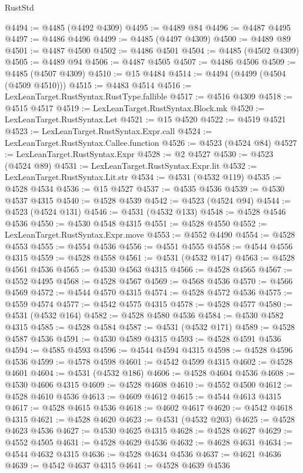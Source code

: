 \begin{lexlean}{RustStd}
\begin{coremodule}
@4494 := @4485 (@4492 @4309)
@4495 := @4489 @84
@4496 := @4487 @4495
@4497 := @4486 @4496
@4499 := @4485 (@4497 @4309)
@4500 := @4489 @89
@4501 := @4487 @4500
@4502 := @4486 @4501
@4504 := @4485 (@4502 @4309)
@4505 := @4489 @94
@4506 := @4487 @4505
@4507 := @4486 @4506
@4509 := @4485 (@4507 @4309)
@4510 := @15 @4484
@4514 := @4494 (@4499 (@4504 (@4509 @4510)))
@4515 := @4483 @4514
@4516 := LexLeanTarget.RustSyntax.RustType.fallible
@4517 := @4516 @4309
@4518 := @4515 @4517
@4519 := LexLeanTarget.RustSyntax.Block.mk
@4520 := LexLeanTarget.RustSyntax.Let
@4521 := @15 @4520
@4522 := @4519 @4521
@4523 := LexLeanTarget.RustSyntax.Expr.call
@4524 := LexLeanTarget.RustSyntax.Callee.function
@4526 := @4523 (@4524 @84)
@4527 := LexLeanTarget.RustSyntax.Expr
@4528 := @2 @4527
@4530 := @4523 (@4524 @89)
@4531 := LexLeanTarget.RustSyntax.Expr.lit
@4532 := LexLeanTarget.RustSyntax.Lit.str
@4534 := @4531 (@4532 @119)
@4535 := @4528 @4534
@4536 := @15 @4527
@4537 := @4535 @4536
@4539 := @4530 @4537 @4315
@4540 := @4528 @4539
@4542 := @4523 (@4524 @94)
@4544 := @4523 (@4524 @131)
@4546 := @4531 (@4532 @133)
@4548 := @4528 @4546 @4536
@4550 := @4530 @4548 @4315
@4551 := @4528 @4550
@4552 := LexLeanTarget.RustSyntax.Expr.move
@4553 := @4552 @4490
@4554 := @4528 @4553
@4555 := @4554 @4536
@4556 := @4551 @4555
@4558 := @4544 @4556 @4315
@4559 := @4528 @4558
@4561 := @4531 (@4532 @147)
@4563 := @4528 @4561 @4536
@4565 := @4530 @4563 @4315
@4566 := @4528 @4565
@4567 := @4552 @4495
@4568 := @4528 @4567
@4569 := @4568 @4536
@4570 := @4566 @4569
@4572 := @4544 @4570 @4315
@4574 := @4528 @4572 @4536
@4575 := @4559 @4574
@4577 := @4542 @4575 @4315
@4578 := @4528 @4577
@4580 := @4531 (@4532 @164)
@4582 := @4528 @4580 @4536
@4584 := @4530 @4582 @4315
@4585 := @4528 @4584
@4587 := @4531 (@4532 @171)
@4589 := @4528 @4587 @4536
@4591 := @4530 @4589 @4315
@4593 := @4528 @4591 @4536
@4594 := @4585 @4593
@4596 := @4544 @4594 @4315
@4598 := @4528 @4596 @4536
@4599 := @4578 @4598
@4601 := @4542 @4599 @4315
@4602 := @4528 @4601
@4604 := @4531 (@4532 @186)
@4606 := @4528 @4604 @4536
@4608 := @4530 @4606 @4315
@4609 := @4528 @4608
@4610 := @4552 @4500
@4612 := @4528 @4610 @4536
@4613 := @4609 @4612
@4615 := @4544 @4613 @4315
@4617 := @4528 @4615 @4536
@4618 := @4602 @4617
@4620 := @4542 @4618 @4315
@4621 := @4528 @4620
@4623 := @4531 (@4532 @203)
@4625 := @4528 @4623 @4536
@4627 := @4530 @4625 @4315
@4628 := @4528 @4627
@4629 := @4552 @4505
@4631 := @4528 @4629 @4536
@4632 := @4628 @4631
@4634 := @4544 @4632 @4315
@4636 := @4528 @4634 @4536
@4637 := @4621 @4636
@4639 := @4542 @4637 @4315
@4641 := @4528 @4639 @4536

\end{coremodule}
\end{lexlean}
